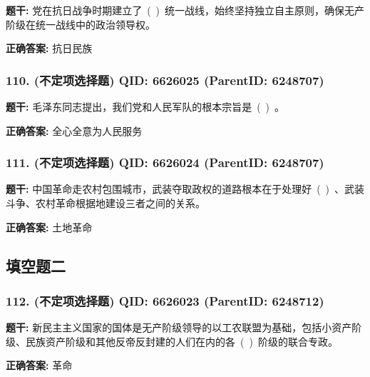 \documentclass[12pt,UTF8]{ctexart}
\begin{document}
\textbf{题干:}
党在抗日战争时期建立了 ( ) 统一战线，始终坚持独立自主原则，确保无产阶级在统一战线中的政治领导权。



\textbf{正确答案:}
抗日民族

\vspace{0.3em}\hrulefill\vspace{0.7em}

\subsubsection*{110. (不定项选择题) \small QID: 6626025 (ParentID: 6248707)}

\textbf{题干:}
毛泽东同志提出，我们党和人民军队的根本宗旨是 ( ) 。



\textbf{正确答案:}
全心全意为人民服务

\vspace{0.3em}\hrulefill\vspace{0.7em}

\subsubsection*{111. (不定项选择题) \small QID: 6626024 (ParentID: 6248707)}

\textbf{题干:}
中国革命走农村包围城市，武装夺取政权的道路根本在于处理好 ( ) 、武装斗争、农村革命根据地建设三者之间的关系。



\textbf{正确答案:}
土地革命

\vspace{0.3em}\hrulefill\vspace{0.7em}

\subsection*{填空题二}

\subsubsection*{112. (不定项选择题) \small QID: 6626023 (ParentID: 6248712)}

\textbf{题干:}
新民主主义国家的国体是无产阶级领导的以工农联盟为基础，包括小资产阶级、民族资产阶级和其他反帝反封建的人们在内的各 ( ) 阶级的联合专政。



\textbf{正确答案:}
革命
\end{document}
